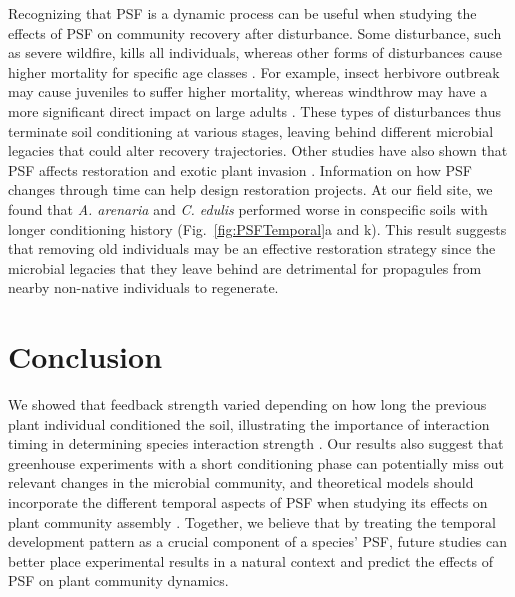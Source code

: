 Recognizing that PSF is a dynamic process can be useful when studying the effects of PSF on community recovery after disturbance. 
Some disturbance, such as severe wildfire, kills all individuals, whereas other forms of disturbances cause higher mortality for specific age classes \citep{Sousa1984}. For example, insect herbivore outbreak may cause juveniles to suffer higher mortality, whereas windthrow may have a more significant direct impact on large adults \citep{Sousa1984}. These types of disturbances thus terminate soil conditioning at various stages, leaving behind different microbial legacies that could alter recovery trajectories. 
Other studies have also shown that PSF affects restoration \citep{Wubs2016} and exotic plant invasion \citep{Suding2013}. Information on how PSF changes through time can help design restoration projects.
At our field site, we found that \textit{A. arenaria} and \textit{C. edulis} performed worse in conspecific soils with longer conditioning history (Fig.~\ref{fig:PSFTemporal}a and k). 
This result suggests that removing old individuals may be an effective restoration strategy since the microbial legacies that they leave behind are detrimental for propagules from nearby non-native individuals to regenerate. 
\par



\section{Conclusion}
We showed that feedback strength varied depending on how long the previous plant individual conditioned the soil, illustrating the importance of interaction timing in determining species interaction strength \citep{Kardol2013Oikos, Peay2018}. 
Our results also suggest that greenhouse experiments with a short conditioning phase can potentially miss out relevant changes in the microbial community, and theoretical models should incorporate the different temporal aspects of PSF when studying its effects on plant community assembly \citep{Kardol2013, KeMiki2015}. 
Together, we believe that by treating the temporal development pattern as a crucial component of a species' PSF, future studies can better place experimental results in a natural context and predict the effects of PSF on plant community dynamics.
\par



